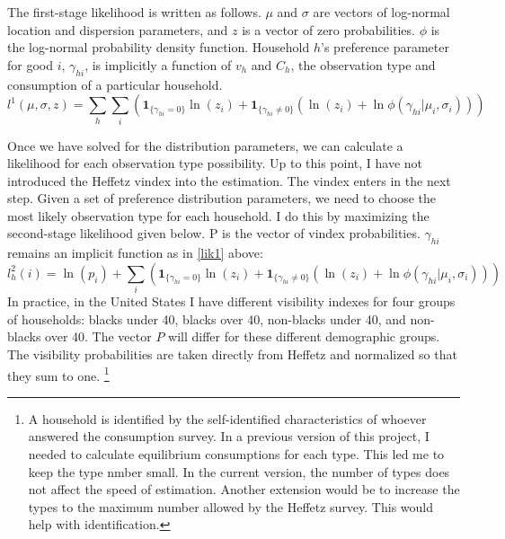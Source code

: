 \documentclass{article}
\begin{document}
The first-stage likelihood is written as follows. $\mu$ and $\sigma$ are vectors of log-normal location and dispersion parameters, and $z$ is a vector of zero probabilities. $\phi$ is the log-normal probability density function. Household $h$'s preference parameter for good $i$, $\gamma_{hi}$, is implicitly a function of $v_h$ and $C_{h}$, the observation type and consumption of a particular household. 
\begin{equation}
	\label{lik1}
	l^1(\mu,\sigma,z) = \sum_{h} \sum_{i} \left(\mathbf{1}_{\{\gamma_{hi} = 0\}}\ln\left(z_i\right) + \mathbf{1}_{\{\gamma_{hi} \neq 0\}} \left(\ln\left(z_i\right)+\ln \phi(\gamma_{hi}|\mu_i,\sigma_i)\right)\right)
\end{equation}

Once we have solved for the distribution parameters, we can calculate a likelihood for each observation type possibility.
Up to this point, I have not introduced the Heffetz vindex into the estimation. The vindex enters in the next step.
Given a set of preference distribution parameters, we need to choose the most likely observation type for each household. I do this by maximizing the second-stage likelihood given below.
P is the vector of vindex probabilities.  $\gamma_{hi}$ remains an implicit function as in \eqref{lik1} above:
\begin{equation}
    \label{lik2}
    l_h^2(i) = \ln(p_i) + \sum_{i} \left(\mathbf{1}_{\{\gamma_{hi} = 0\}}\ln\left(z_i\right) + \mathbf{1}_{\{\gamma_{hi} \neq 0\}} \left(\ln\left(z_i\right)+\ln \phi(\gamma_{hi}|\mu_i,\sigma_i)\right)\right)
\end{equation}
In practice, in the United States I have different visibility indexes for four groups of households: blacks under 40, blacks over 40, non-blacks under 40, and non-blacks over 40.
The vector $P$ will differ for these different demographic groups.
The visibility probabilities are taken directly from Heffetz and normalized so that they sum to one.
\footnote{A household is identified by the self-identified characteristics of whoever answered the consumption survey. 
In a previous version of this project, I needed to calculate equilibrium consumptions for each type.  This led me to keep the type nmber small.  In the current version, the number of types does not affect the speed of estimation.  Another extension would be to increase the types to the maximum number allowed by the Heffetz survey. This would help with identification.}
\end{document}

